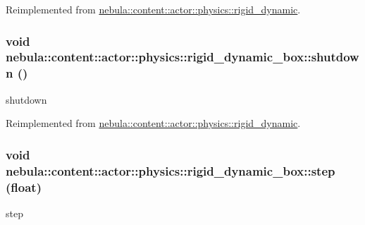 Reimplemented from \hyperlink{classnebula_1_1content_1_1actor_1_1physics_1_1rigid__dynamic_a24bc7fc5707d3d387e57d0516f1cbd0e}{nebula::content::actor::physics::rigid\_\-dynamic}.\hypertarget{classnebula_1_1content_1_1actor_1_1physics_1_1rigid__dynamic__box_a3f9abbce238ad6bee7363ab9a849512c}{
\subsubsection[{shutdown}]{\setlength{\rightskip}{0pt plus 5cm}void nebula::content::actor::physics::rigid\_\-dynamic\_\-box::shutdown ()}}
\label{classnebula_1_1content_1_1actor_1_1physics_1_1rigid__dynamic__box_a3f9abbce238ad6bee7363ab9a849512c}


shutdown 

Reimplemented from \hyperlink{classnebula_1_1content_1_1actor_1_1physics_1_1rigid__dynamic_a712d45c781944f79af0d074062674e20}{nebula::content::actor::physics::rigid\_\-dynamic}.\hypertarget{classnebula_1_1content_1_1actor_1_1physics_1_1rigid__dynamic__box_a849dd1aec8bf8be223dc3d7d9c1f81b5}{
\subsubsection[{step}]{\setlength{\rightskip}{0pt plus 5cm}void nebula::content::actor::physics::rigid\_\-dynamic\_\-box::step (float)}}
\label{classnebula_1_1content_1_1actor_1_1physics_1_1rigid__dynamic__box_a849dd1aec8bf8be223dc3d7d9c1f81b5}


step 

